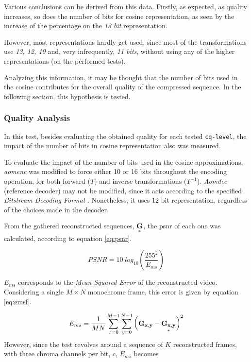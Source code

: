 Various conclusions can be derived from this data.
Firstly, as expected, as quality increases, so does the number of bits for cosine representation, as seen by the increase of the percentage on the \emph{13 bit} representation.

However, most representations hardly get used, since most of the transformations use \emph{13, 12, 10} and, very infrequently, \emph{11 bits}, without using any of the higher representations (on the performed tests). 

Analyzing this information, it may be thought that the number of bits used in the cosine contributes for the overall quality of the compressed sequence. In the following section, this hypothesis is tested.

\subsubsection{Quality Analysis}

In this test, besides evaluating the obtained quality for each tested \texttt{cq-level}, the impact of the number of bits in cosine representation also was measured. 

To evaluate the impact of the number of bits used in the cosine approximations, \emph{aomenc} was modified to force either 10 or 16 bits throughout the encoding operation, for both forward ($T$) and inverse transformations ($T^{-1}$). \emph{Aomdec} (reference decoder) may not be modified, since it acts according to the specified \emph{Bitstream Decoding Format} \cite{AV1BitstreamDecoding}. Nonetheless, it uses $12$ bit representation, regardless of the choices made in the decoder.

From the gathered reconstructed sequences, $\underset{*}{\mathbf{G}}$, the \gls{psnr} of each one was calculated, according to equation \ref{eq:psnr}.

\begin{equation} \label{eq:psnr}
    PSNR = 10\;log_{10}\left(\frac{255^2}{E_{ms}}\right)
\end{equation}

$E_{ms}$ corresponds to the \emph{Mean Squared Error} of the reconstructed video. Considering a single $M \times N$ monochrome frame, this error is given by equation \ref{eq:emsf}.

\begin{equation} \label{eq:emsf}
    E_{ms} = \frac{1}{MN}\sum^{M-1}_{x=0} \sum^{N-1}_{y=0} \left(\mathbf{G_{x,y}} - \underset{*}{\mathbf{G_{x,y}}}\right)^2
\end{equation}
However, since the test revolves around a sequence of $K$ reconstructed frames, with three chroma channels per bit, $c$, $E_{ms}$ becomes

